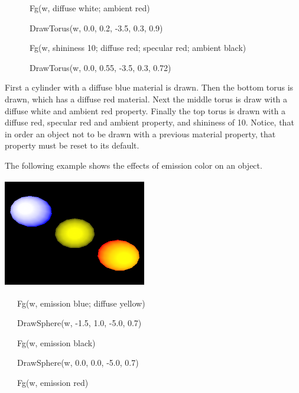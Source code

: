 \documentclass[letterpaper]{article}
\begin{document}
{{\sffamily
\ \ \ \ \ \ Fg(w, {\textquotedbl}diffuse white; ambient red{\textquotedbl})}

{\sffamily
\ \ \ \ \ \ DrawTorus(w, 0.0, 0.2, -3.5, 0.3, 0.9)}

{\sffamily
\ \ \ \ \ \ Fg(w, {\textquotedbl}shininess 10; diffuse red; specular red; ambient black{\textquotedbl})}

{\sffamily
\ \ \ \ \ \ DrawTorus(w, 0.0, 0.55, -3.5, 0.3, 0.72)}


\bigskip

First a cylinder with a diffuse blue material is drawn. Then the
bottom torus is drawn, which has a diffuse red material. Next the
middle torus is draw with a diffuse white and ambient red
property. Finally the top torus is drawn with a diffuse red, specular
red and ambient property, and shininess of 10. Notice, that in order
an object not to be drawn with a previous material property, that
property must be reset to its default.

The following example shows the effects of emission color on an object.


\bigskip

{\centering  \includegraphics[width=2.4598in,height=1.8799in]{utr9/utr9-img025.png} \par}

\bigskip

{\sffamily
\ \ \ Fg(w, {\textquotedbl}emission blue; diffuse yellow{\textquotedbl}) }

{\sffamily
\ \ \ DrawSphere(w, -1.5, 1.0, -5.0, 0.7)}

{\sffamily
\ \ \ Fg(w, {\textquotedbl}emission black{\textquotedbl})}

{\sffamily
\ \ \ DrawSphere(w, 0.0, 0.0, -5.0, 0.7)}

{\sffamily
\ \ \ Fg(w, {\textquotedbl}emission red{\textquotedbl})}

}
\end{document}
